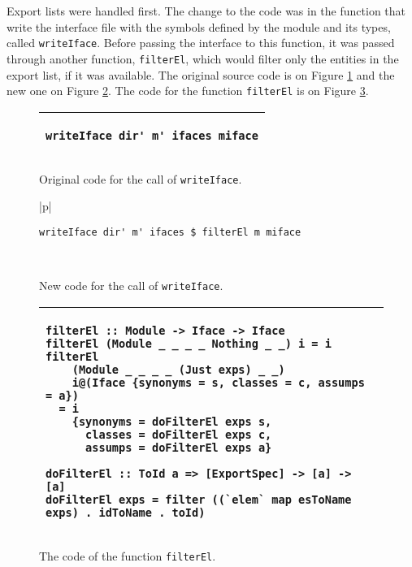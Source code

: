\documentclass[msc]{ppgccufmg}
\begin{document}
Export lists were handled first.
The change to the code was in the function that write the interface file with the symbols defined by the module and its types, called \texttt{writeIface}.
Before passing the interface to this function, it was passed through another function, \texttt{filterEl}, which would filter only the entities in the export list, if it was available.
The original source code is on Figure \ref{el-orig} and the new one on Figure \ref{el-new}.
The code for the function \texttt{filterEl} is on Figure \ref{filterEl}.

\begin{figure}
\caption{Original code for the call of \texttt{writeIface}.\label{el-orig}}
\begin{tabular}{|p{\textwidth}|}
\hline
\begin{verbatim}
writeIface dir' m' ifaces miface
\end{verbatim}
\\
\hline
\end{tabular}
\end{figure}

\begin{figure}
\caption{New code for the call of \texttt{writeIface}.\label{el-new}}
\begin{tabular}{|p{\textwidth}|}
\hline
\begin{verbatim}
writeIface dir' m' ifaces $ filterEl m miface
\end{verbatim}
\\
\hline
\end{tabular}
\end{figure}

\begin{figure}
\caption{The code of the function \texttt{filterEl}.\label{filterEl}}
\begin{tabular}{|p{\textwidth}|}
\hline
\begin{verbatim}
filterEl :: Module -> Iface -> Iface
filterEl (Module _ _ _ _ Nothing _ _) i = i
filterEl
    (Module _ _ _ _ (Just exps) _ _)
    i@(Iface {synonyms = s, classes = c, assumps = a})
  = i
    {synonyms = doFilterEl exps s,
      classes = doFilterEl exps c,
      assumps = doFilterEl exps a}

doFilterEl :: ToId a => [ExportSpec] -> [a] -> [a]
doFilterEl exps = filter ((`elem` map esToName exps) . idToName . toId)
\end{verbatim}
\\
\hline
\end{tabular}
\end{figure}
\end{document}

